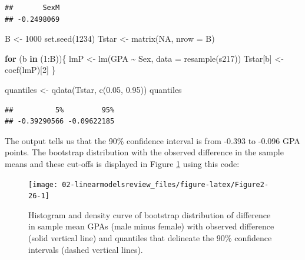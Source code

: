 \documentclass[
]{book}
\newenvironment{Shaded}{\begin{snugshade}}{\end{snugshade}}
\newcommand{\AttributeTok}[1]{\textcolor[rgb]{0.77,0.63,0.00}{#1}}
\newcommand{\ConstantTok}[1]{\textcolor[rgb]{0.00,0.00,0.00}{#1}}
\newcommand{\ControlFlowTok}[1]{\textcolor[rgb]{0.13,0.29,0.53}{\textbf{#1}}}
\newcommand{\DecValTok}[1]{\textcolor[rgb]{0.00,0.00,0.81}{#1}}
\newcommand{\FloatTok}[1]{\textcolor[rgb]{0.00,0.00,0.81}{#1}}
\newcommand{\FunctionTok}[1]{\textcolor[rgb]{0.00,0.00,0.00}{#1}}
\newcommand{\NormalTok}[1]{#1}
\newcommand{\OtherTok}[1]{\textcolor[rgb]{0.56,0.35,0.01}{#1}}
\newcommand{\SpecialCharTok}[1]{\textcolor[rgb]{0.00,0.00,0.00}{#1}}
\begin{document}
\begin{verbatim}
##       SexM 
## -0.2498069
\end{verbatim}

\begin{Shaded}
\begin{Highlighting}[]
\NormalTok{B }\OtherTok{\textless{}{-}} \DecValTok{1000}
\FunctionTok{set.seed}\NormalTok{(}\DecValTok{1234}\NormalTok{)}
\NormalTok{Tstar }\OtherTok{\textless{}{-}} \FunctionTok{matrix}\NormalTok{(}\ConstantTok{NA}\NormalTok{, }\AttributeTok{nrow =}\NormalTok{ B)}

\ControlFlowTok{for}\NormalTok{ (b }\ControlFlowTok{in}\NormalTok{ (}\DecValTok{1}\SpecialCharTok{:}\NormalTok{B))\{}
\NormalTok{  lmP }\OtherTok{\textless{}{-}} \FunctionTok{lm}\NormalTok{(GPA }\SpecialCharTok{\textasciitilde{}}\NormalTok{ Sex, }\AttributeTok{data =} \FunctionTok{resample}\NormalTok{(s217))}
\NormalTok{  Tstar[b] }\OtherTok{\textless{}{-}} \FunctionTok{coef}\NormalTok{(lmP)[}\DecValTok{2}\NormalTok{]}
\NormalTok{\}}

\NormalTok{quantiles }\OtherTok{\textless{}{-}} \FunctionTok{qdata}\NormalTok{(Tstar, }\FunctionTok{c}\NormalTok{(}\FloatTok{0.05}\NormalTok{, }\FloatTok{0.95}\NormalTok{))}
\NormalTok{quantiles}
\end{Highlighting}
\end{Shaded}

\begin{verbatim}
##          5%         95% 
## -0.39290566 -0.09622185
\end{verbatim}

The output tells us that the 90\% confidence interval is from -0.393
to -0.096 GPA
points. The bootstrap distribution with the observed difference in the sample
means and these cut-offs is displayed in Figure \ref{fig:Figure2-26} using
this code:



\begin{figure}[ht!]

{\centering \texttt{[image: 02-linearmodelsreview\_files/figure-latex/Figure2-26-1]} 

}

\caption{Histogram and density curve of bootstrap distribution of difference in sample mean GPAs (male minus female) with observed difference (solid vertical line) and quantiles that delineate the 90\% confidence intervals (dashed vertical lines).}\label{fig:Figure2-26}
\end{figure}
\end{document}
